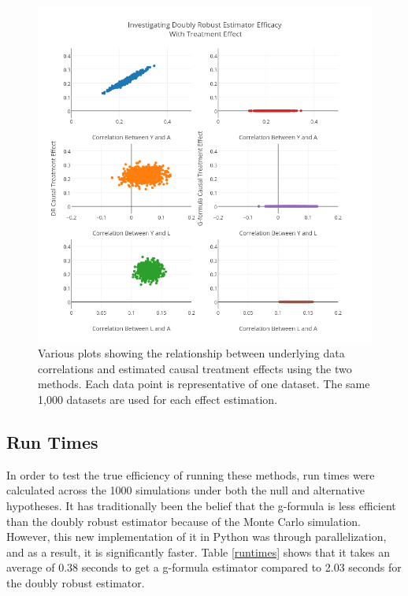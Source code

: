 \begin{figure}[h!]
\includegraphics[width = \linewidth]{figures/correlation2.png}
\caption[Scatterplots of relationships between estimates and data correlations under the alternative hypothesis]{Various plots showing the relationship between underlying data correlations and estimated causal treatment effects using the two methods.  Each data point is representative of one dataset.  The same 1,000 datasets are used for each effect estimation.}
\label{correlation2}
\end{figure}


\newpage
\subsection{Run Times} 
In order to test the true efficiency of running these methods, run times were calculated across the 1000 simulations under both the null and alternative hypotheses.  It has traditionally been the belief that the g-formula is less efficient than the doubly robust estimator because of the Monte Carlo simulation.  However, this new implementation of it in Python was through parallelization, and as a result, it is significantly faster.  Table \ref{runtimes} shows that it takes an average of 0.38 seconds to get a g-formula estimator compared to 2.03 seconds for the doubly robust estimator.  

